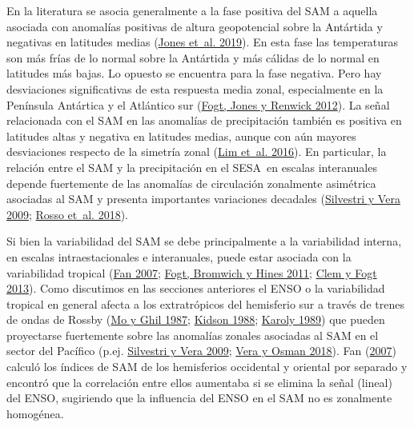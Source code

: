 \documentclass[12pt,oneside,a4paper]{reedthesis}
\begin{document}
En la literatura se asocia generalmente a la fase positiva del SAM a aquella asociada con anomalías positivas de altura geopotencial sobre la Antártida y negativas en latitudes medias (\protect\hyperlink{ref-jones2019}{Jones et~al. 2019}).
En esta fase las temperaturas son más frías de lo normal sobre la Antártida y más cálidas de lo normal en latitudes más bajas.
Lo opuesto se encuentra para la fase negativa.
Pero hay desviaciones significativas de esta respuesta media zonal, especialmente en la Península Antártica y el Atlántico sur (\protect\hyperlink{ref-fogt2012}{Fogt, Jones y Renwick 2012}).
La señal relacionada con el SAM en las anomalías de precipitación también es positiva en latitudes altas y negativa en latitudes medias, aunque con aún mayores desviaciones respecto de la simetría zonal (\protect\hyperlink{ref-lim2016}{Lim et~al. 2016}).
En particular, la relación entre el SAM y la precipitación en el SESA~en escalas interanuales depende fuertemente de las anomalías de circulación zonalmente asimétrica asociadas al SAM y presenta importantes variaciones decadales (\protect\hyperlink{ref-silvestri2009}{Silvestri y Vera 2009}; \protect\hyperlink{ref-rosso2018}{Rosso et~al. 2018}).

Si bien la variabilidad del SAM se debe principalmente a la variabilidad interna, en escalas intraestacionales e interanuales, puede estar asociada con la variabilidad tropical (\protect\hyperlink{ref-fan2007}{Fan 2007}; \protect\hyperlink{ref-fogt2011a}{Fogt, Bromwich y Hines 2011}; \protect\hyperlink{ref-clem2013}{Clem y Fogt 2013}).
Como discutimos en las secciones anteriores el ENSO o la variabilidad tropical en general afecta a los extratrópicos del hemisferio sur a través de trenes de ondas de Rossby (\protect\hyperlink{ref-mo1987}{Mo y Ghil 1987}; \protect\hyperlink{ref-kidson1988}{Kidson 1988}; \protect\hyperlink{ref-karoly1989}{Karoly 1989}) que pueden proyectarse fuertemente sobre las anomalías zonales asociadas al SAM en el sector del Pacífico (p.ej. \protect\hyperlink{ref-silvestri2009}{Silvestri y Vera 2009}; \protect\hyperlink{ref-vera2018}{Vera y Osman 2018}).
Fan (\protect\hyperlink{ref-fan2007}{2007}) calculó los índices de SAM de los hemisferios occidental y oriental por separado y encontró que la correlación entre ellos aumentaba si se elimina la señal (lineal) del ENSO, sugiriendo que la influencia del ENSO en el SAM no es zonalmente homogénea.
\end{document}
